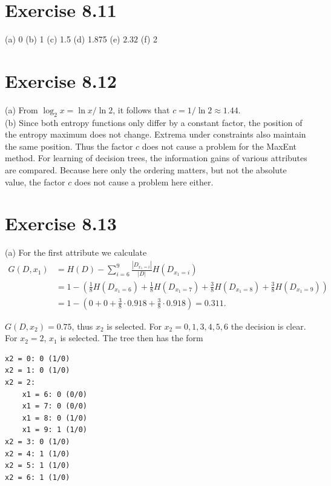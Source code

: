 \documentclass[10pt]{book}
\begin{document}
\section{Exercise 8.11}
(a) 0 (b) 1 (c) 1.5 (d) 1.875 (e) $2.32$ (f) 2

\section{Exercise 8.12}
(a) From $\log_{2} x = \ln x / \ln 2$, it follows that $c = 1/\ln 2 \approx 1.44$.\\
(b) Since both entropy functions only differ by a constant factor, the position of the entropy maximum does not change. Extrema under constraints also maintain the same position. Thus the factor $c$ does not cause a problem for the MaxEnt method. For learning of decision trees, the information gains of various attributes are compared. Because here only the ordering matters, but not the absolute value, the factor $c$ does not cause a problem here either.

\section{Exercise 8.13}
(a) For the first attribute we calculate
$$
\begin{aligned}
G(D, x_{1}) &= H(D) - \sum_{i=6}^{9} \frac{|D_{x_{1}=i}|}{|D|} H(D_{x_{1}=i}) \\
&= 1 - \left(\frac{1}{8} H(D_{x_{1}=6}) + \frac{1}{8} H(D_{x_{1}=7}) + \frac{3}{8} H(D_{x_{1}=8}) + \frac{3}{8} H(D_{x_{1}=9})\right) \\
&= 1 - \left(0 + 0 + \frac{3}{8}\cdot 0.918 + \frac{3}{8}\cdot 0.918\right) = 0.311.
\end{aligned}
$$

$G(D, x_{2}) = 0.75$, thus $x_{2}$ is selected. For $x_{2}=0,1,3,4,5,6$ the decision is clear. For $x_{2}=2$, $x_{1}$ is selected. The tree then has the form
\begin{verbatim}
x2 = 0: 0 (1/0)
x2 = 1: 0 (1/0)
x2 = 2:
    x1 = 6: 0 (0/0)
    x1 = 7: 0 (0/0)
    x1 = 8: 0 (1/0)
    x1 = 9: 1 (1/0)
x2 = 3: 0 (1/0)
x2 = 4: 1 (1/0)
x2 = 5: 1 (1/0)
x2 = 6: 1 (1/0)
\end{verbatim}
\end{document}
